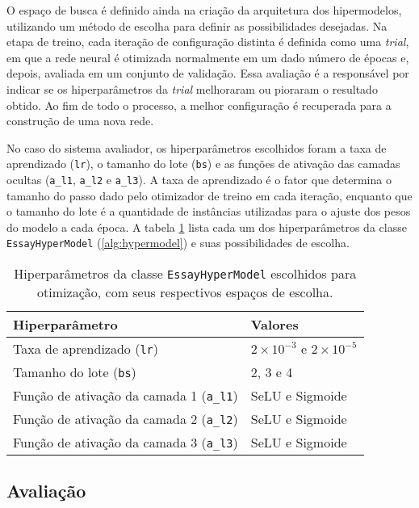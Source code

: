 O espaço de busca é definido ainda na criação da arquitetura dos hipermodelos, utilizando um método de escolha para definir as possibilidades desejadas. Na etapa de treino, cada iteração de configuração distinta é definida como uma \textit{trial}, em que a rede neural é otimizada normalmente em um dado número de épocas e, depois, avaliada em um conjunto de validação. Essa avaliação é a responsável por indicar se os hiperparâmetros da \textit{trial} melhoraram ou pioraram o resultado obtido. Ao fim de todo o processo, a melhor configuração é recuperada para a construção de uma nova rede.

No caso do sistema avaliador, os hiperparâmetros escolhidos foram a taxa de aprendizado (\texttt{lr}), o tamanho do lote (\texttt{bs}) e as funções de ativação das camadas ocultas (\texttt{a\_l1}, \texttt{a\_l2} e \texttt{a\_l3}). A taxa de aprendizado é o fator que determina o tamanho do passo dado pelo otimizador de treino em cada iteração, enquanto que o tamanho do lote é a quantidade de instâncias utilizadas para o ajuste dos pesos do modelo a cada época. A tabela \ref{tab:hyperparameters-to-tune} lista cada um dos hiperparâmetros da classe \texttt{EssayHyperModel} (\autoref{alg:hypermodel}) e suas possibilidades de escolha.

\begin{table}[H]
    \centering
    \caption{Hiperparâmetros da classe \texttt{EssayHyperModel} escolhidos para otimização, com seus respectivos espaços de escolha.}
    \label{tab:hyperparameters-to-tune}
    \begin{tabular}{ll}
        \toprule
        \textbf{Hiperparâmetro} & \textbf{Valores} \\
        \midrule
        Taxa de aprendizado (\texttt{lr}) & $2 \times 10^{-3}$ e $2 \times 10^{-5}$ \\
        Tamanho do lote (\texttt{bs}) & 2, 3 e 4 \\
        Função de ativação da camada 1 (\texttt{a\_l1}) & SeLU e Sigmoide \\
        Função de ativação da camada 2 (\texttt{a\_l2}) & SeLU e Sigmoide \\
        Função de ativação da camada 3 (\texttt{a\_l3}) & SeLU e Sigmoide \\
        \bottomrule
    \end{tabular}
\end{table}


\subsection{Avaliação}

